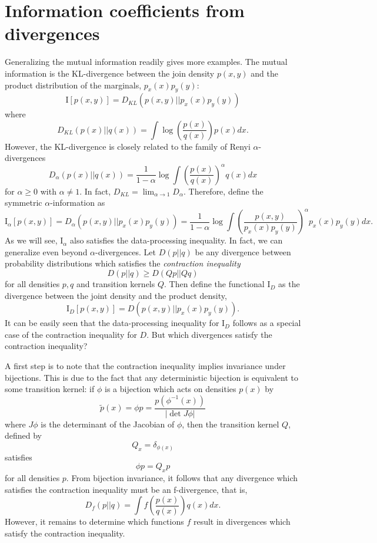 \documentclass[12pt]{article}
\begin{document}
\section{Information coefficients from divergences}

Generalizing the mutual information readily gives more examples.  The
mutual information is the KL-divergence between the join density
$p(x,y)$ and the product distribution of the marginals,
$p_x(x)p_y(y)$:
\[
\text{I}[p(x,y)] = D_{KL}(p(x,y)||p_x(x)p_y(y))
\]
where
\[
D_{KL}(p(x)||q(x)) = \int \log\left(\frac{p(x)}{q(x)}\right) p(x) dx.
\]
However, the KL-divergence is closely related to the family of Renyi
$\alpha$-divergences
\[
D_\alpha(p(x)||q(x)) = \frac{1}{1-\alpha} \log \int  \left(\frac{p(x)}{q(x)}\right)^\alpha q(x) dx
\]
for $\alpha \geq 0$ with $\alpha \neq 1$.  In fact, $D_{KL}
= \lim_{\alpha \to 1} D_\alpha$.
Therefore, define the symmetric $\alpha$-information as
\[
\text{I}_{\alpha}[p(x,y)] = D_\alpha(p(x,y)||p_x(x)p_y(y)) = \frac{1}{1-\alpha} \log \int  \left(\frac{p(x,y)}{p_x(x)p_y(y)}\right)^\alpha p_x(x) p_y(y) dx.
\]
As we will see, $\text{I}_\alpha$ also satisfies the data-processing
inequality.  In fact, we can generalize even beyond
$\alpha$-divergences.  Let $D(p||q)$ be any divergence between
probability distributions which satisfies the \emph{contraction inequality}
\[
D(p||q) \geq D(Qp||Qq)
\]
for all densities $p, q$ and transition kernels $Q$.
Then define the functional $\text{I}_D$ as the divergence between the joint density and the product density,
\[
\text{I}_D[p(x,y)] = D(p(x,y)||p_x(x)p_y(y)).
\]
It can be easily seen that the data-processing inequality for
$\text{I}_D$ follows as a special case of the contraction inequality
for $D$.  But which divergences satisfy the contraction inequality?

A first step is to note that the contraction inequality implies
invariance under bijections.  This is due to the fact that any
deterministic bijection is equivalent to some transition kernel: if
$\phi$ is a bijection which acts on densities $p(x)$ by
\[
\tilde{p}(x) = \phi p = \frac{p(\phi^{-1}(x))}{|\det J \phi|}
\]
where $J \phi$ is the determinant of the Jacobian of $\phi$,
then the transition kernel $Q$, defined by
\[
Q_x = \delta_{\phi(x)}
\]
satisfies
\[
\phi p = Q_x p
\]
for all densities $p$.
From bijection invariance, it follows that any divergence which satisfies
the contraction inequality must be an f-divergence, that is,
\begin{equation}\label{eq:f_divergence}
D_f(p||q) = \int f\left(\frac{p(x)}{q(x)}\right) q(x) dx.
\end{equation}
However, it remains to determine which functions $f$ result in
divergences which satisfy the contraction inequality.
\end{document}
